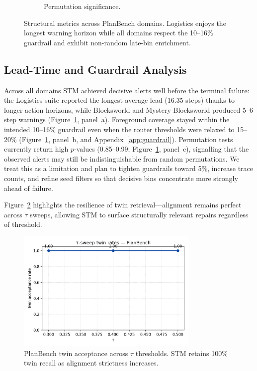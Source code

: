 \documentclass[11pt]{article}
\begin{document}
\begin{figure}[h]
\begin{subfigure}[t]{0.32\textwidth}
    \caption{Permutation significance.}
  \end{subfigure}
  \caption{Structural metrics across PlanBench domains. Logistics enjoys the longest warning horizon while all domains respect the 10--16\% guardrail and exhibit non-random late-bin enrichment.}
  \label{fig:planbench-metrics}
\end{figure}

\subsection{Lead-Time and Guardrail Analysis}
Across all domains STM achieved decisive alerts well before the terminal failure: the Logistics suite reported the longest average lead (16.35 steps) thanks to longer action horizons, while Blocksworld and Mystery Blocksworld produced 5--6 step warnings (Figure~\ref{fig:planbench-metrics}, panel~a). Foreground coverage stayed within the intended 10--16\% guardrail even when the router thresholds were relaxed to 15--20\% (Figure~\ref{fig:planbench-metrics}, panel~b, and Appendix~\ref{app:guardrail}). Permutation tests currently return high $p$-values (0.85--0.99; Figure~\ref{fig:planbench-metrics}, panel~c), signalling that the observed alerts may still be indistinguishable from random permutations. We treat this as a limitation and plan to tighten guardrails toward 5\%, increase trace counts, and refine seed filters so that decisive bins concentrate more strongly ahead of failure.

Figure~\ref{fig:tau-planbench} highlights the resilience of twin retrieval---alignment remains perfect across \(\tau\) sweeps, allowing STM to surface structurally relevant repairs regardless of threshold.

\begin{figure}[h]
  \centering
  \includegraphics[width=0.78\textwidth]{../note/fig_tau_sweep_planbench.png}
  \caption{PlanBench twin acceptance across \(\tau\) thresholds. STM retains 100\% twin recall as alignment strictness increases.}
  \label{fig:tau-planbench}
\end{figure}
\end{document}
